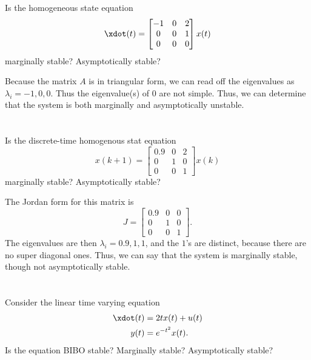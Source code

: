 \documentclass[10pt]{article}
\begin{document}
\section{}
Is the homogeneous state equation 
\begin{equation*}
  \xdot (t)  =
  \begin{bmatrix}
    -1 & 0 & 2\\ 0 & 0 & 1 \\ 0 & 0 & 0
  \end{bmatrix}x(t)
\end{equation*}
marginally stable? Asymptotically stable?

Because the matrix $A$ is in triangular form, we can read off the
eigenvalues as $\lambda_i = -1, 0, 0$.  Thus the eigenvalue(s) of $0$
are not simple.  Thus, we can determine that the system is both
marginally and asymptotically unstable.

\section{}
Is the discrete-time homogenous stat equation
\begin{equation*}
  x(k+1) =
  \begin{bmatrix}
    0.9 & 0 & 2\\ 0 & 1 & 0\\ 0 & 0 & 1
  \end{bmatrix}x(k)
\end{equation*}
marginally stable? Asymptotically stable?

The Jordan form for this matrix is
\begin{equation*}
  J =
  \begin{bmatrix}
    0.9 & 0 & 0 \\ 0 & 1 & 0\\ 0 & 0 & 1
  \end{bmatrix}.
\end{equation*}
The eigenvalues are then $\lambda_i = 0.9, 1, 1$, and the $1$'s are
distinct, because there are no super diagonal ones.  Thus, we can say
that the system is marginally stable, though not asymptotically
stable.





\section{}
Consider the linear time varying equation
\begin{equation}
  \begin{split}
    \xdot(t) &= 2tx(t) + u(t) \\
    y(t) &= e^{-t^2}x(t).
  \end{split}
\end{equation}
Is the equation BIBO stable? Marginally stable? Asymptotically stable?
\end{document}
